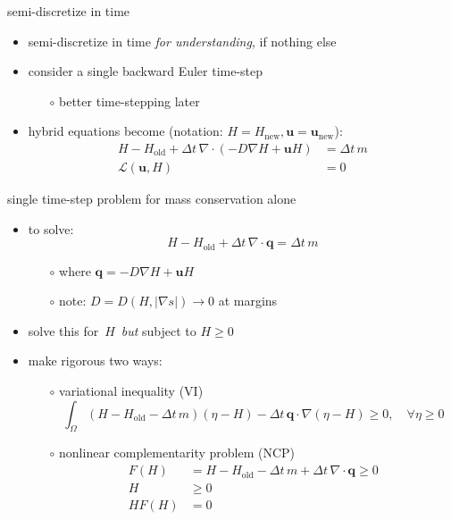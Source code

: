 \documentclass[hide notes,intlimits,usenames,dvipsnames]{beamer}
\newcommand{\Div}{\nabla\cdot}
\newcommand{\grad}{\nabla}
\begin{document}
\begin{frame}{semi-discretize in time}

\begin{itemize}
\item semi-discretize in time \emph{for understanding}, if nothing else
\item consider a single backward Euler time-step
    \begin{itemize}
    \item[$\circ$] better time-stepping later
    \end{itemize}
\item hybrid equations become (notation: $H=H_{\mathrm{new}}, \mathbf{u}=\mathbf{u}_{\mathrm{new}}$):
        \begin{align*}
        H - H_{\mathrm{old}} + \Delta t\, \Div (-D \grad H + \mathbf{u} H) &= \Delta t\, m \\
        \mathcal{L}(\mathbf{u},H) &= 0
        \end{align*}
\end{itemize}
\end{frame}


\begin{frame}{single time-step problem for mass conservation alone}

\small

\begin{itemize}
\item to solve:
        \begin{equation*}
        H - H_{\mathrm{old}} + \Delta t\, \Div \mathbf{q} = \Delta t\, m
        \end{equation*}
   \begin{itemize}

\vspace{-5mm}
   \item[$\circ$] where $\mathbf{q} = -D \grad H + \mathbf{u} H$
   \item[$\circ$] note: $D=D(H,|\grad s|) \to 0$ at margins
   \end{itemize}
\item solve this for \,$H$\, \emph{but} subject to $H \ge 0$
\item make rigorous two ways:
    \begin{itemize}
    \item[$\circ$] variational inequality (VI)
    $$\int_\Omega (H - H_{\mathrm{old}} -\Delta t\, m) (\eta - H) - \Delta t\, \mathbf{q} \cdot \grad(\eta - H) \ge 0, \quad \forall \eta \ge 0$$
    \item[$\circ$] nonlinear complementarity problem (NCP)
\begin{align*}
F(H)   &= H - H_{\mathrm{old}} -\Delta t\, m + \Delta t\,\Div \mathbf{q} \ge 0 \\
H      &\ge 0 \\
H F(H) &= 0
\end{align*}
    \end{itemize}
\end{itemize}
\end{frame}
\end{document}
